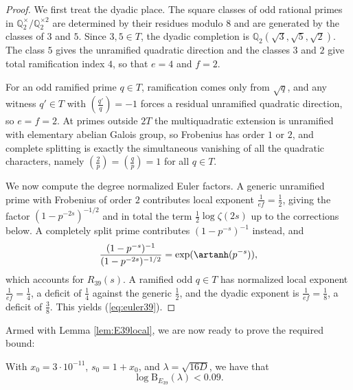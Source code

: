 \begin{proof}
We first treat the dyadic place.  The square classes of odd rational primes in $\mathbb{Q}_2^\times/\mathbb{Q}_2^{\times2}$ are determined by their residues modulo $8$ and are generated by the classes of $3$ and $5$.  Since $3,5\in T$, the dyadic completion is $\mathbb{Q}_2(\sqrt3,\sqrt5,\sqrt2)$.  The class $5$ gives the unramified quadratic direction and the classes $3$ and $2$ give total ramification index $4$, so that $e=4$ and $f=2$.

For an odd ramified prime $q\in T$, ramification comes only from $\sqrt q$, and any witness $q'\in T$ with $\left(\frac{q'}{q}\right)=-1$ forces a residual unramified quadratic direction, so $e=f=2$.  At primes outside $2T$ the multiquadratic extension is unramified with elementary abelian Galois group, so Frobenius has order $1$ or $2$, and complete splitting is exactly the simultaneous vanishing of all the quadratic characters, namely $\left(\frac{2}{p}\right)=\left(\frac{q}{p}\right)=1$ for all $q\in T$.

We now compute the degree normalized Euler factors.  A generic unramified prime with Frobenius of order $2$ contributes local exponent $\frac1{ef}=\frac12$, giving the factor $(1-p^{-2s})^{-1/2}$ and in total the term $\frac12\log\zeta(2s)$ up to the corrections below.  A completely split prime contributes $(1-p^{-s})^{-1}$ instead, and
\[
   \frac{(1-p^{-s})^{-1}}{(1-p^{-2s})^{-1/2}}
   =\exp(\artanh(p^{-s})),
\]
which accounts for $R_{39}(s)$.  A ramified odd $q\in T$ has normalized local exponent $\frac1{ef}=\frac14$, a deficit of $\frac14$ against the generic $\frac12$, and the dyadic exponent is $\frac1{ef}=\frac18$, a deficit of $\frac38$.  This yields (\ref{eq:euler39}).
\end{proof}

Armed with Lemma \ref{lem:E39local}, we are now ready to prove the required bound:

\begin{proposition}\label{prop:B39}
With $x_0=3\cdot10^{-11}$, $s_0=1+x_0$, and $\lambda=\sqrt{16D}$, we have that
\[
   \log \mathrm{B}_{E_{39}}(\lambda)<0.09.
\]
\end{proposition}

